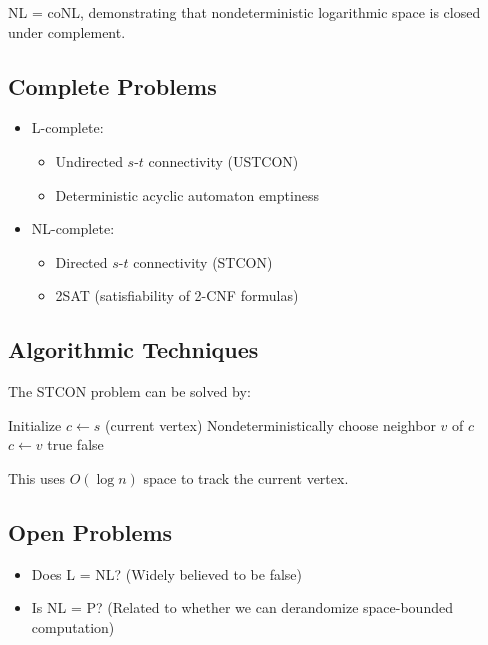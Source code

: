 \begin{theorem}
\textsf{NL} = \textsf{coNL}, demonstrating that nondeterministic logarithmic space is closed under complement.
\end{theorem}

\subsection{Complete Problems}

\begin{itemize}
    \item \textsf{L}-complete: 
    \begin{itemize}
        \item Undirected $s$-$t$ connectivity (USTCON)
        \item Deterministic acyclic automaton emptiness
    \end{itemize}
    
    \item \textsf{NL}-complete:
    \begin{itemize}
        \item Directed $s$-$t$ connectivity (STCON)
        \item 2SAT (satisfiability of 2-CNF formulas)
    \end{itemize}
\end{itemize}

\subsection{Algorithmic Techniques}

\begin{example}
The STCON problem can be solved by:
\begin{algorithmic}[1]
\STATE Initialize $c \gets s$ (current vertex)
\STATE Nondeterministically choose neighbor $v$ of $c$
\STATE $c \gets v$
 \RETURN true \ENDIF
\ENDFOR
\RETURN false
\end{algorithmic}
This uses $O(\log n)$ space to track the current vertex.
\end{example}

\subsection{Open Problems}

\begin{itemize}
    \item Does \textsf{L} = \textsf{NL}? (Widely believed to be false)
    \item Is \textsf{NL} = \textsf{P}? (Related to whether we can derandomize space-bounded computation)
\end{itemize}

